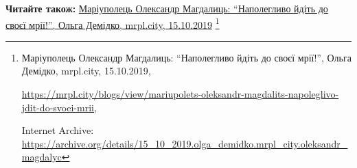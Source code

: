  
 
 
 
 

\def\pubIA{https://archive.org/details/15_10_2019.olga_demidko.mrpl_city.oleksandr_magdalyc}
\def\pubTitle{Маріуполець Олександр Магдалиць: \enquote{Наполегливо йдіть до своєї мрії!}}
\def\pubDate{15.10.2019}
\def\pubOrigin{https://mrpl.city/blogs/view/mariupolets-oleksandr-magdalits-napoleglivo-jdit-do-svoei-mrii}
\def\pubAuthor{Ольга Демідко}

\textbf{Читайте також:} \href{\pubIA}{%
\pubTitle, \pubAuthor, mrpl.city, \pubDate}%
\footnote{\pubTitle, \pubAuthor, mrpl.city, \pubDate, \par\url{\pubOrigin}, \par Internet Archive: \url{\pubIA}}
